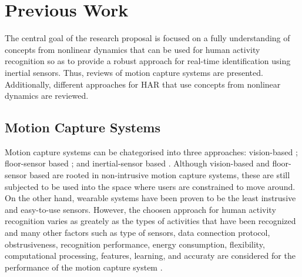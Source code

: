 
\chapter{Previous Work}

\ifpdf
    \graphicspath{{Chapter2/Figs/Raster/}{Chapter2/Figs/PDF/}{Chapter2/Figs/}}
\else
    \graphicspath{{Chapter2/Figs/Vector/}{Chapter2/Figs/}}
\fi

The central goal of the research proposal is focused on a fully understanding of 
concepts from nonlinear dynamics that can be used for human activity recognition 
so as to provide a robust approach for real-time identification using inertial sensors.
Thus, reviews of motion capture systems are presented. Additionally, 
different approaches for HAR 
that use concepts from nonlinear dynamics are reviewed. 

\section{Motion Capture Systems}
Motion capture systems can be chategorised into three approaches: 
vision-based \cite{Forsyth2005}; 
floor-sensor based
\cite{Paradiso1997,Steinhage2008,Aguilar2007,Wimmer2011,Yin2003,Moere2004,
Richardson2004,Srinivasan2005, Rangarajan2008,Visell2010, Rajalingham2010}
; and inertial-sensor based
\cite{Razak2012,Bamberg2008,Benocci2009,Xu2012,Holleczek2010}.
Although vision-based and floor-sensor based are rooted in non-intrusive 
motion capture systems, these are still subjected to be used into the space 
where users are constrained to move around.
On the other hand, wearable systems have been proven to be the least instrusive 
and easy-to-use sensors. However, the choosen approach for human activity 
recognition varies as greately as the 
types of activities that have been recognized 
and many other factors such as type of sensors, data connection protocol, obstrusiveness, 
recognition performance, energy consumption, flexibility, computational processing,
features, learning, and accuraty 
are considered for the performance of the motion capture system \cite{Lara2013}.

